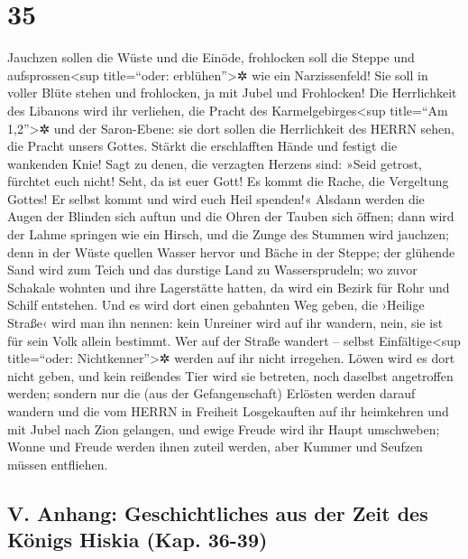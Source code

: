 \hypertarget{section-34}{%
\section{35}\label{section-34}}

Jauchzen sollen die Wüste und die Einöde, frohlocken soll
die Steppe und aufsprossen\textless sup title=``oder:
erblühen''\textgreater✲ wie ein Narzissenfeld! Sie soll in
voller Blüte stehen und frohlocken, ja mit Jubel und Frohlocken! Die
Herrlichkeit des Libanons wird ihr verliehen, die Pracht des
Karmelgebirges\textless sup title=``Am 1,2''\textgreater✲ und der
Saron-Ebene: sie dort sollen die Herrlichkeit des HERRN sehen, die
Pracht unsers Gottes. Stärkt die erschlafften Hände und
festigt die wankenden Knie! Sagt zu denen, die verzagten
Herzens sind: »Seid getrost, fürchtet euch nicht! Seht, da ist euer
Gott! Es kommt die Rache, die Vergeltung Gottes! Er selbst kommt und
wird euch Heil spenden!« Alsdann werden die Augen der
Blinden sich auftun und die Ohren der Tauben sich öffnen;
dann wird der Lahme springen wie ein Hirsch, und die Zunge
des Stummen wird jauchzen; denn in der Wüste quellen Wasser hervor und
Bäche in der Steppe; der glühende Sand wird zum Teich und
das durstige Land zu Wassersprudeln; wo zuvor Schakale wohnten und ihre
Lagerstätte hatten, da wird ein Bezirk für Rohr und Schilf entstehen.
Und es wird dort einen gebahnten Weg geben, die ›Heilige
Straße‹ wird man ihn nennen: kein Unreiner wird auf ihr wandern, nein,
sie ist für sein Volk allein bestimmt. Wer auf der Straße wandert --
selbst Einfältige\textless sup title=``oder: Nichtkenner''\textgreater✲
werden auf ihr nicht irregehen. Löwen wird es dort nicht
geben, und kein reißendes Tier wird sie betreten, noch daselbst
angetroffen werden; sondern nur die (aus der Gefangenschaft) Erlösten
werden darauf wandern und die vom HERRN in Freiheit
Losgekauften auf ihr heimkehren und mit Jubel nach Zion gelangen, und
ewige Freude wird ihr Haupt umschweben; Wonne und Freude werden ihnen
zuteil werden, aber Kummer und Seufzen müssen entfliehen.

\hypertarget{v.-anhang-geschichtliches-aus-der-zeit-des-kuxf6nigs-hiskia-kap.-36-39}{%
\subsection{V. Anhang: Geschichtliches aus der Zeit des Königs Hiskia
(Kap.
36-39)}\label{v.-anhang-geschichtliches-aus-der-zeit-des-kuxf6nigs-hiskia-kap.-36-39}}

